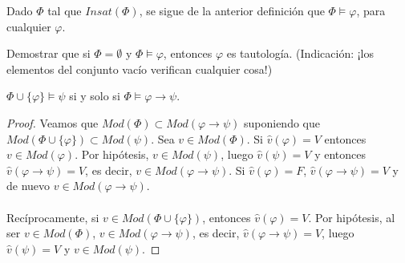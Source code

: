 \begin{example} Dado $\Phi$ tal que $Insat(\Phi)$, se sigue de la anterior definición que $\Phi \vDash \varphi$, para cualquier $\varphi$.
\end{example}

\begin{ex} Demostrar que si $\Phi = \emptyset$ y $\Phi \vDash \varphi$, entonces $\varphi$ es tautología. (Indicación: ¡los elementos del conjunto vacío verifican cualquier cosa!)
\end{ex}

\begin{prop} $\Phi \cup \{\varphi\} \vDash \psi$ si y solo si $\Phi \vDash \varphi \rightarrow \psi$.
\end{prop}
\begin{proof}
Veamos que $Mod(\Phi) \subset Mod(\varphi \rightarrow \psi)$ suponiendo que $Mod(\Phi \cup \{\varphi\}) \subset Mod(\psi)$. Sea $v \in Mod(\Phi)$. Si $\hat{v}(\varphi) = V$ entonces $v \in Mod(\varphi)$. Por hipótesis, $v \in Mod(\psi)$, luego $\hat{v}(\psi) = V$ y entonces $\hat{v}(\varphi \rightarrow \psi) = V$, es decir, $v \in Mod(\varphi \rightarrow \psi)$. Si  $\hat{v}(\varphi) = F$, $\hat{v}(\varphi \rightarrow \psi) = V$ y de nuevo $v \in Mod(\varphi \rightarrow \psi)$. \\ \\
Recíprocamente, si $v\in Mod(\Phi \cup \{\varphi\})$, entonces $\hat{v}(\varphi) = V$. Por hipótesis, al ser $v \in Mod(\Phi)$, $v \in Mod(\varphi \rightarrow \psi)$, es decir, $\hat{v}(\varphi \rightarrow \psi) = V$, luego $\hat{v}(\psi) = V$ y $v \in Mod(\psi)$.
\end{proof}

